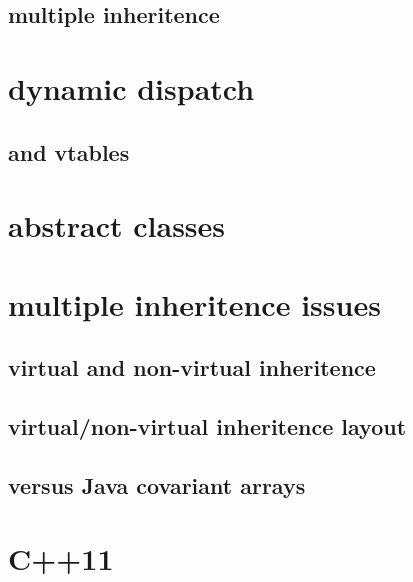 

\subsection{multiple inheritence}



\section{dynamic dispatch}



\subsection{and vtables}



\section{abstract classes}



\section{multiple inheritence issues}

\subsection{virtual and non-virtual inheritence}



\subsection{virtual/non-virtual inheritence layout}



\subsection{versus Java covariant arrays}



\section{C++11}

